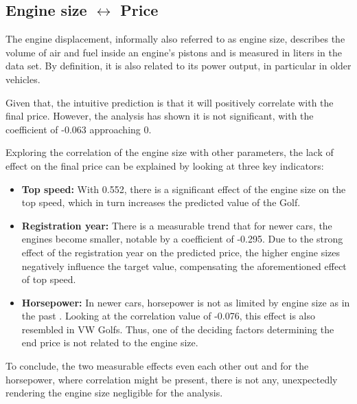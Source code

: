 \subsection{Engine size $\leftrightarrow$ Price}
The engine displacement, informally also referred to as engine size, describes the volume of air and fuel inside an engine's pistons \autocite{EngineDisplacement2024}
and is measured in liters in the data set.
By definition, it is also related to its power output, in particular in older vehicles.
\par
Given that, the intuitive prediction is that it will positively correlate with the final price.
However, the analysis has shown it is not significant, with the coefficient of -0.063 approaching 0.
\par
Exploring the correlation of the engine size with other parameters, the lack of effect on the final price can be explained by looking at
three key indicators:
\begin{itemize}
    \item \textbf{Top speed: }
          With 0.552, there is a significant effect of the engine size on the top speed, which in turn increases the predicted value of the Golf.
    \item \textbf{Registration year: }
          There is a measurable trend that for newer cars, the engines become smaller, notable by a coefficient of -0.295.
          Due to the strong effect of the registration year on the predicted price, the higher engine sizes negatively influence the target value,
          compensating the aforementioned effect of top speed.
    \item \textbf{Horsepower: }
          In newer cars, horsepower is not as limited by engine size as in the past \autocite{WhatEngineDisplacement}.
          Looking at the correlation value of -0.076, this effect is also resembled in VW Golfs. Thus, one of the deciding factors determining the end price
          is not related to the engine size.
\end{itemize}
To conclude, the two measurable effects even each other out and for the horsepower, where correlation might be present, there is not any, unexpectedly rendering the
engine size negligible for the analysis. 

